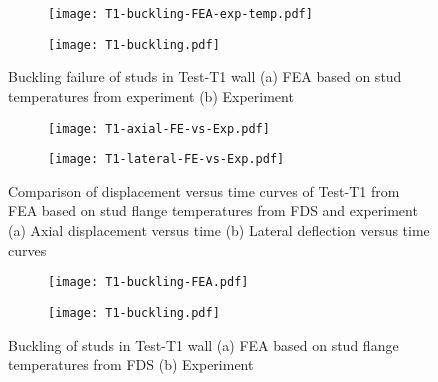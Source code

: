 \begin{figure}[!htbp]
	\centering
	\begin{subfigure}[b]{0.8\textwidth}
		\centering
		\texttt{[image: T1-buckling-FEA-exp-temp.pdf]}
		\caption{}
		\label{subfig:T1-buckling-FEA-exp-temp}
	\end{subfigure}
	\begin{subfigure}[b]{0.4\textwidth}
		\centering
		\texttt{[image: T1-buckling.pdf]}
		\caption{}
		\label{subfig:T1-buckling-FEA-Exp-exp-temp}
	\end{subfigure}
	   \caption{Buckling failure of studs in Test-T1 wall (a) FEA based on stud temperatures from experiment (b) Experiment}
	   \label{fig:T1-buckling-FE-vs-Exp-exp-temp}
\end{figure} 
\begin{figure}[!htbp]
	\centering
	\begin{subfigure}[b]{0.7\textwidth}
		\centering
		\texttt{[image: T1-axial-FE-vs-Exp.pdf]}
		\caption{}
		\label{subfig:T1-axial-FE-vs-Exp}
	\end{subfigure}
	\begin{subfigure}[b]{0.7\textwidth}
		\centering
		\texttt{[image: T1-lateral-FE-vs-Exp.pdf]}
		\caption{}
		\label{subfig:T1-lateral-FE-vs-Exp}
	\end{subfigure}
	   \caption{Comparison of displacement versus time curves of Test-T1 from FEA based on stud flange temperatures from FDS and experiment (a) Axial displacement versus time (b) Lateral deflection versus time curves}
	   \label{fig:T1-structural-FE-vs-Exp-exp-temp-disp}
\end{figure} 
\begin{figure}[!htbp]
	\centering
	\begin{subfigure}[b]{0.8\textwidth}
		\centering
		\texttt{[image: T1-buckling-FEA.pdf]}
		\caption{}
		\label{subfig:T1-buckling-FEA}
	\end{subfigure}
	\begin{subfigure}[b]{0.4\textwidth}
		\centering
		\texttt{[image: T1-buckling.pdf]}
		\caption{}
		\label{subfig:T1-buckling-FEA-Exp}
	\end{subfigure}
	   \caption{Buckling of studs in Test-T1 wall (a) FEA based on stud flange temperatures from FDS (b) Experiment}
	   \label{fig:T1-buckling-FE-vs-Exp}
\end{figure} 

